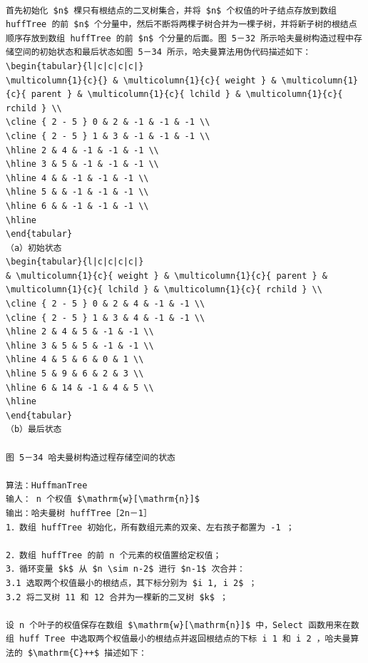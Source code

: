 \documentclass[10pt]{article}
\begin{document}
\begin{verbatim}

首先初始化 $n$ 棵只有根结点的二叉树集合，并将 $n$ 个权值的叶子结点存放到数组 huffTree 的前 $n$ 个分量中，然后不断将两棵子树合并为一棵子树，并将新子树的根结点顺序存放到数组 huffTree 的前 $n$ 个分量的后面。图 5－32 所示哈夫曼树构造过程中存储空间的初始状态和最后状态如图 5－34 所示，哈夫曼算法用伪代码描述如下：
\begin{tabular}{l|c|c|c|c|}
\multicolumn{1}{c}{} & \multicolumn{1}{c}{ weight } & \multicolumn{1}{c}{ parent } & \multicolumn{1}{c}{ lchild } & \multicolumn{1}{c}{ rchild } \\
\cline { 2 - 5 } 0 & 2 & -1 & -1 & -1 \\
\cline { 2 - 5 } 1 & 3 & -1 & -1 & -1 \\
\hline 2 & 4 & -1 & -1 & -1 \\
\hline 3 & 5 & -1 & -1 & -1 \\
\hline 4 & & -1 & -1 & -1 \\
\hline 5 & & -1 & -1 & -1 \\
\hline 6 & & -1 & -1 & -1 \\
\hline
\end{tabular}
（a）初始状态
\begin{tabular}{l|c|c|c|c|} 
& \multicolumn{1}{c}{ weight } & \multicolumn{1}{c}{ parent } & \multicolumn{1}{c}{ lchild } & \multicolumn{1}{c}{ rchild } \\
\cline { 2 - 5 } 0 & 2 & 4 & -1 & -1 \\
\cline { 2 - 5 } 1 & 3 & 4 & -1 & -1 \\
\hline 2 & 4 & 5 & -1 & -1 \\
\hline 3 & 5 & 5 & -1 & -1 \\
\hline 4 & 5 & 6 & 0 & 1 \\
\hline 5 & 9 & 6 & 2 & 3 \\
\hline 6 & 14 & -1 & 4 & 5 \\
\hline
\end{tabular}
（b）最后状态

图 5－34 哈夫曼树构造过程存储空间的状态

算法：HuffmanTree
输人： n 个权值 $\mathrm{w}[\mathrm{n}]$
输出：哈夫曼树 huffTree［2n－1］
1．数组 huffTree 初始化，所有数组元素的双亲、左右孩子都置为 -1 ；

2．数组 huffTree 的前 n 个元素的权值置给定权值；
3．循环变量 $k$ 从 $n \sim n-2$ 进行 $n-1$ 次合并：
3.1 选取两个权值最小的根结点，其下标分别为 $i 1, i 2$ ；
3.2 将二叉树 11 和 12 合并为一棵新的二叉树 $k$ ；

设 n 个叶子的权值保存在数组 $\mathrm{w}[\mathrm{n}]$ 中，Select 函数用来在数组 huff Tree 中选取两个权值最小的根结点并返回根结点的下标 i 1 和 i 2 ，哈夫曼算法的 $\mathrm{C}++$ 描述如下：
\end{verbatim}
\end{document}
